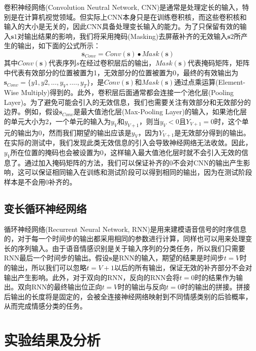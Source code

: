 卷积神经网络(Convolution Neutral Network, CNN)是通常是处理定长的输入，特别是在计算机视觉领域。但实际上CNN本身只是在训练卷积核，而这些卷积核和输入的大小是无关的，因此CNN具备处理变长输入的能力。为了只保留有效的输入$\mathbf{s}1$对输出结果的影响，我们将采用掩码(Masking)去屏蔽补齐的无效输入$\mathbf{s}2$所产生的输出，如下面的公式所示：
\begin{equation}
\label{equ:cnn_mask}
    \mathbf{s}_{Conv} = Conv(\mathbf{s}) \bullet Mask(\mathbf{s})
\end{equation}
其中$Conv(\mathbf{s})$代表序列$s$在经过卷积层后的输出，$Mask(\mathbf{s})$代表掩码矩阵，矩阵中代表有效部分的位置被置为1，无效部分的位置被置为0，最终的有效输出为$\mathbf{s}_{Conv}=\{y1,y2,...,y_V,....,y_T\}$，是$Conv(\mathbf{s})$和$Mask(\mathbf{s})$通过点乘运算(Element-Wise Multiply)得到的。此外，卷积层后面通常都会连接一个池化层(Pooling Layer)。为了避免可能会引入的无效信息，我们也需要关注有效部分和无效部分的边界。例如，假设$\mathbf{s}_{Conv}$是最大值池化层(Max-Pooling Layer)的输入，如果池化层的单元大小为2，一个单元的输入为$y_V$和$y_{V+1}$，则当$y_V<0$且$Y_{V+1}=0$时，这个单元的输出为0，然而我们期望的输出应该是$y_V$，因为$Y_{V+1}$是无效部分得到的输出。在实际的测试中，我们发现此类无效信息的引入会导致神经网络无法收敛。因此，$y_V$所在位置的掩码也会被设置为0，这样输入最大值池化层时就不会引入无效的信息了。通过加入掩码矩阵的方法，我们可以保证补齐的0不会对CNN的输出产生影响，这可以保证相同输入在训练和测试阶段可以得到相同的输出，因为在测试阶段样本是不会用0补齐的。

\subsection{变长循环神经网络}
\label{ssec:var_len_rnn}

循环神经网络(Recurrent Neural Network, RNN)是用来建模语音信号的时序信息的，对于每一个时间步的输出都采用相同的参数进行计算，同样也可以用来处理变长的序列输入。由于语音情感识别是关于输入序列的分类任务，所以我们只需要RNN最后一个时间步的输出。假设$\mathbf{s}$是RNN的输入，期望的结果是时间步$t=V$时的输出，所以我们可以忽略$t=V+1$以后的所有输出，保证无效的补齐部分不会对输出产生影响。此外，对于双向的RNN，反向的RNN会将$t=0$时的结果作为输出。双向RNN的最终输出位正向$t=V$时的输出与反向$t=0$时的输出的拼接。拼接后输出的长度将是固定的，会被全连接神经网络映射到不同情感类别的后验概率，从而完成情感分类的任务。

\section{实验结果及分析}
\label{sec:var_len_experiment}

